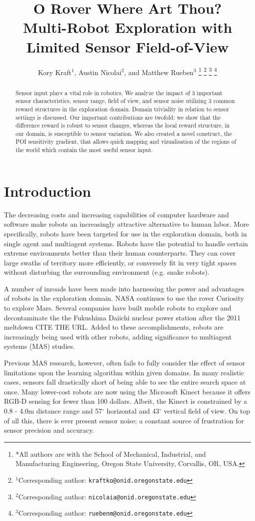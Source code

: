 \documentclass[letterpaper, 10 pt, conference]{ieeeconf}  %
\title{\LARGE \bf 
O Rover Where Art Thou?\\
Multi-Robot Exploration with Limited Sensor Field-of-View
}
\author{Kory Kraft$^{1}$, Austin Nicolai$^{2}$, and Matthew Rueben$^{3}$%
\thanks{*All authors are with the School of Mechanical, Industrial, and Manufacturing Engineering,
         Oregon State University,
         Corvallis, OR, USA. }%
\thanks{$^{1}$Corresponding author: {\tt\small kraftko@onid.oregonstate.edu}}%
\thanks{$^{2}$Corresponding author: {\tt\small nicolaia@onid.oregonstate.edu}}%
\thanks{$^{3}$Corresponding author: {\tt\small ruebenm@onid.oregonstate.edu}}%
}
\begin{document}
\maketitle
\thispagestyle{empty}
\pagestyle{empty}

\begin{abstract}
Sensor input plays a vital role in robotics.
We analyze the impact of 3 important sensor characteristics, sensor range,
field of view, and sensor noise utilizing 3 common reward structures in the 
exploration domain. Domain triviality in relation to sensor settings is discussed.
Our important contributions are twofold: we show that the 
difference reward is robust to sensor changes, whereas 
the local reward structure, in our domain, is susceptible to sensor variation.
We also created a novel construct, the POI sensitivity gradient, that allows
quick mapping and vizualisation of the regions of the world which
contain the most useful sensor input.  
\end{abstract}


\section{Introduction}
The decreasing costs and increasing capabilities of computer hardware and software make
robots an increasingly attractive alternative to human labor. More specifically, robots have 
been targeted for use in the exploration domain, both in single agent and 
multiagent systems.  Robots have the potential to
handle certain extreme environments better than their human
counterparts.  They can cover large swaths of territory more
efficiently, or conversely fit in very tight spaces without disturbing
the surrounding environment (e.g. snake robots). 

A number of inroads have been made into harnessing the power and
advantages of robots in the exploration domain. NASA continues to use
the rover Curiosity to explore Mars. Several companies have built
mobile robots to explore and decontaminate the the Fukushima Daiichi
nuclear power station after the 2011 meltdown CITE THE URL. Added to these
accomplishments, robots are increasingly being used with other robots, 
adding significance to multiagent systems (MAS) studies.

Previous MAS research, however, often fails to fully consider the effect of
sensor limitations upon the learning algorithm within given domains. In many realistic cases, sensors fall drastically short of being able to see the entire search space at once. Many lower-cost robots are now using the Microsoft Kinect because it offers RGB-D sensing for fewer than 100 dollars. Albeit, the Kinect is constrained by a 0.8 - 4.0m distance range and 57$^{\circ}$ horizontal and 43$^{\circ}$ vertical field of view. On top of all this, there is ever present sensor noise; a constant source of frustration for sensor precision and accuracy.
\end{document}
